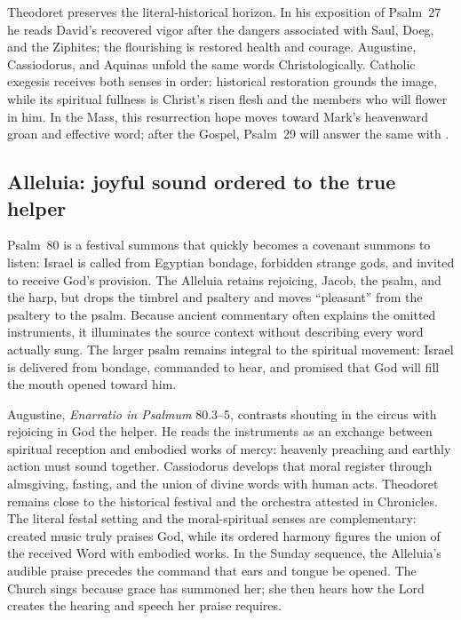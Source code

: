 Theodoret preserves the literal-historical horizon. In his exposition of Psalm~27 he reads
David's recovered vigor after the dangers associated with Saul, Doeg, and the
Ziphites; the flourishing is restored health and courage. Augustine,
Cassiodorus, and Aquinas unfold the same words Christologically. Catholic
exegesis receives both senses in order: historical restoration grounds the
image, while its spiritual fullness is Christ's risen flesh and the members
who will flower in him. In the Mass, this resurrection hope moves toward Mark's
heavenward groan and effective word; after the Gospel, Psalm~29 will answer the
same  with .

\subsection*{Alleluia: joyful sound ordered to the true helper\enspace{}}

Psalm~80 is a festival summons that quickly becomes a covenant summons to
listen: Israel is called from Egyptian bondage, forbidden strange gods, and
invited to receive God's provision. The Alleluia retains rejoicing, Jacob,
the psalm, and the harp, but drops the timbrel and psaltery and moves
``pleasant'' from the psaltery to the psalm. Because ancient commentary often
explains the omitted instruments, it illuminates the source context without
describing every word actually sung. The larger psalm remains integral to the
spiritual movement: Israel is delivered from bondage, commanded to hear, and
promised that God will fill the mouth opened toward him.

Augustine, \emph{Enarratio in Psalmum} 80.3--5, contrasts shouting in the
circus with rejoicing in God the helper. He reads the instruments as an
exchange between spiritual reception and embodied works of mercy: heavenly
preaching and earthly action must sound together. Cassiodorus develops that
moral register through almsgiving, fasting, and the union of divine words
with human acts. Theodoret remains close to the historical festival and the
orchestra attested in Chronicles. The literal festal setting and the
moral-spiritual senses are complementary: created music truly praises God,
while its ordered harmony figures the union of the received Word with embodied
works. In the Sunday sequence, the Alleluia's audible praise precedes the
command that ears and tongue be opened. The Church sings because grace has
summoned her; she then hears how the Lord creates the hearing and speech her
praise requires.

